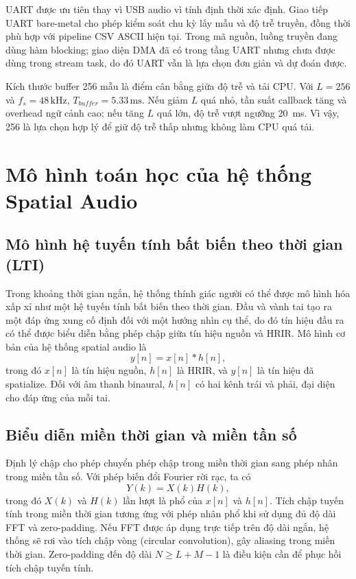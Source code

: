 UART được ưu tiên thay vì USB audio vì tính định thời xác định. Giao tiếp UART bare-metal cho phép kiểm soát chu kỳ lấy mẫu và độ trễ truyền, đồng thời phù hợp với pipeline CSV ASCII hiện tại. Trong mã nguồn, luồng truyền đang dùng hàm blocking; giao diện DMA đã có trong tầng UART nhưng chưa được dùng trong stream task, do đó UART vẫn là lựa chọn đơn giản và dự đoán được.

Kích thước buffer 256 mẫu là điểm cân bằng giữa độ trễ và tải CPU. Với $L=256$ và $f_s=48\,\text{kHz}$, $T_{buffer}=5.33\,\text{ms}$. Nếu giảm $L$ quá nhỏ, tần suất callback tăng và overhead ngữ cảnh cao; nếu tăng $L$ quá lớn, độ trễ vượt ngưỡng \SI{20}{\milli\second}. Vì vậy, 256 là lựa chọn hợp lý để giữ độ trễ thấp nhưng không làm CPU quá tải.

\chapter{Mô hình toán học của hệ thống Spatial Audio}

\section{Mô hình hệ tuyến tính bất biến theo thời gian (LTI)}
Trong khoảng thời gian ngắn, hệ thống thính giác người có thể được mô hình hóa xấp xỉ như một hệ tuyến tính bất biến theo thời gian. Đầu và vành tai tạo ra một đáp ứng xung cố định đối với một hướng nhìn cụ thể, do đó tín hiệu đầu ra có thể được biểu diễn bằng phép chập giữa tín hiệu nguồn và HRIR. Mô hình cơ bản của hệ thống spatial audio là
\begin{equation}
    y[n] = x[n] * h[n],
\end{equation}
trong đó $x[n]$ là tín hiệu nguồn, $h[n]$ là HRIR, và $y[n]$ là tín hiệu đã spatialize. Đối với âm thanh binaural, $h[n]$ có hai kênh trái và phải, đại diện cho đáp ứng của mỗi tai.

\section{Biểu diễn miền thời gian và miền tần số}
Định lý chập cho phép chuyển phép chập trong miền thời gian sang phép nhân trong miền tần số. Với phép biến đổi Fourier rời rạc, ta có
\begin{equation}
    Y(k) = X(k)H(k),
\end{equation}
trong đó $X(k)$ và $H(k)$ lần lượt là phổ của $x[n]$ và $h[n]$. Tích chập tuyến tính trong miền thời gian tương ứng với phép nhân phổ khi sử dụng đủ độ dài FFT và zero-padding. Nếu FFT được áp dụng trực tiếp trên độ dài ngắn, hệ thống sẽ rơi vào tích chập vòng (circular convolution), gây aliasing trong miền thời gian. Zero-padding đến độ dài $N \ge L+M-1$ là điều kiện cần để phục hồi tích chập tuyến tính.

